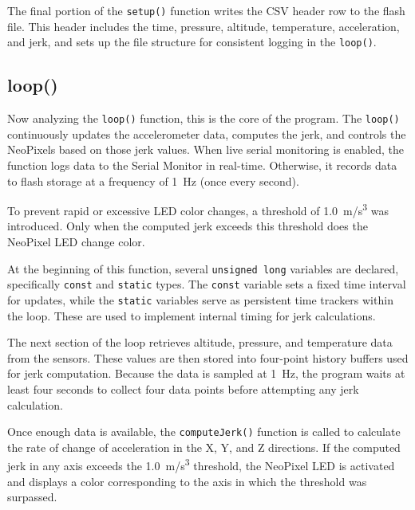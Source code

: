 \documentclass[12pt]{report}
\begin{document}
The final portion of the \texttt{setup()} function writes the CSV header row to the flash file. This header includes the time, pressure, altitude, temperature, acceleration, and jerk, and sets up the file structure for consistent logging in the \texttt{loop()}.

\subsection*{loop()}
Now analyzing the \texttt{loop()} function, this is the core of the program. The \texttt{loop()} continuously updates the accelerometer data, computes the jerk, and controls the NeoPixels based on those jerk values. When live serial monitoring is enabled, the function logs data to the Serial Monitor in real-time. Otherwise, it records data to flash storage at a frequency of 1~Hz (once every second). \newline

To prevent rapid or excessive LED color changes, a threshold of 1.0~m/s\textsuperscript{3} was introduced. Only when the computed jerk exceeds this threshold does the NeoPixel LED change color. \newline

At the beginning of this function, several \texttt{unsigned long} variables are declared, specifically \texttt{const} and \texttt{static} types. The \texttt{const} variable sets a fixed time interval for updates, while the \texttt{static} variables serve as persistent time trackers within the loop. These are used to implement internal timing for jerk calculations. \newline

The next section of the loop retrieves altitude, pressure, and temperature data from the sensors. These values are then stored into four-point history buffers used for jerk computation. Because the data is sampled at 1~Hz, the program waits at least four seconds to collect four data points before attempting any jerk calculation. \newline

Once enough data is available, the \texttt{computeJerk()} function is called to calculate the rate of change of acceleration in the X, Y, and Z directions. If the computed jerk in any axis exceeds the 1.0~m/s\textsuperscript{3} threshold, the NeoPixel LED is activated and displays a color corresponding to the axis in which the threshold was surpassed. \newline
\end{document}

